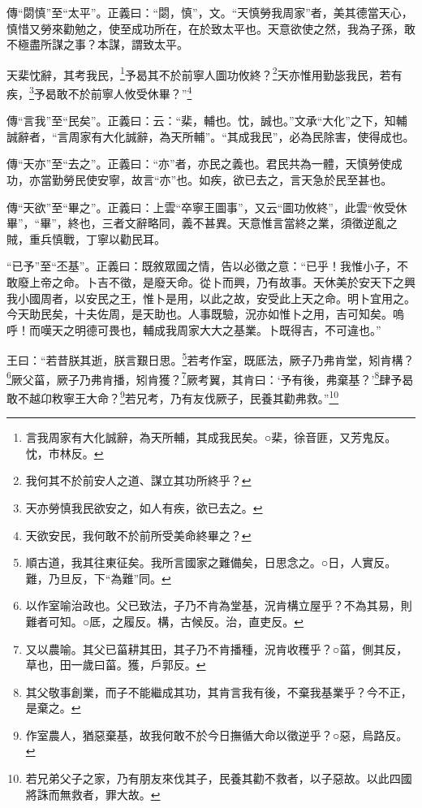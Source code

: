 {\noindent\zhuan{}\fzbyks 傳“閟慎”至“太平”。正義曰：“閟，慎”，文。“天慎勞我周家”者，美其德當天心，慎惜又勞來勸勉之，使至成功所在，在於致太平也。天意欲使之然，我為子孫，敢不極盡所謀之事？本謀，謂致太平。 \par}

天棐忱辭，其考我民，\footnote{言我周家有大化誠辭，為天所輔，其成我民矣。○棐，徐音匪，又芳鬼反。忱，市林反。}予曷其不於前寧人圖功攸終？\footnote{我何其不於前安人之道、謀立其功所終乎？}天亦惟用勤毖我民，若有疾，\footnote{天亦勞慎我民欲安之，如人有疾，欲已去之。}予曷敢不於前寧人攸受休畢？”\footnote{天欲安民，我何敢不於前所受美命終畢之？}

{\noindent\zhuan{}\fzbyks 傳“言我”至“民矣”。正義曰：云：“棐，輔也。忱，誠也。”文承“大化”之下，知輔誠辭者，“言周家有大化誠辭，為天所輔”。“其成我民”，必為民除害，使得成也。 \par}

{\noindent\zhuan{}\fzbyks 傳“天亦”至“去之”。正義曰：“亦”者，亦民之義也。君民共為一體，天慎勞使成功，亦當勤勞民使安寧，故言“亦”也。如疾，欲已去之，言天急於民至甚也。 \par}

{\noindent\zhuan{}\fzbyks 傳“天欲”至“畢之”。正義曰：上雲“卒寧王圖事”，又云“圖功攸終”，此雲“攸受休畢”，“畢”，終也，三者文辭略同，義不甚異。天意惟言當終之業，須徵逆亂之賊，重兵慎戰，丁寧以勸民耳。 \par}

{\noindent\shu{}\fzkt “已予”至“丕基”。正義曰：既敘眾國之情，告以必徵之意：“已乎！我惟小子，不敢廢上帝之命。卜吉不徵，是廢天命。從卜而興，乃有故事。天休美於安天下之興我小國周者，以安民之王，惟卜是用，以此之故，安受此上天之命。明卜宜用之。今天助民矣，十夫佐周，是天助也。人事既驗，況亦如惟卜之用，吉可知矣。嗚呼！而嘆天之明德可畏也，輔成我周家大大之基業。卜既得吉，不可違也。” \par}

王曰：“若昔朕其逝，朕言艱日思。\footnote{順古道，我其往東征矣。我所言國家之難備矣，日思念之。○日，人實反。難，乃旦反，下“為難”同。}若考作室，既厎法，厥子乃弗肯堂，矧肯構？\footnote{以作室喻治政也。父已致法，子乃不肯為堂基，況肯構立屋乎？不為其易，則難者可知。○厎，之履反。構，古候反。治，直吏反。}厥父菑，厥子乃弗肯播，矧肯獲？\footnote{又以農喻。其父已菑耕其田，其子乃不肯播種，況肯收穫乎？○菑，側其反，草也，田一歲曰菑。獲，戶郭反。}厥考翼，其肯曰：‘予有後，弗棄基？’\footnote{其父敬事創業，而子不能繼成其功，其肯言我有後，不棄我基業乎？今不正，是棄之。}肆予曷敢不越卬敉寧王大命？\footnote{作室農人，猶惡棄基，故我何敢不於今日撫循大命以徵逆乎？○惡，烏路反。}若兄考，乃有友伐厥子，民養其勸弗救。”\footnote{若兄弟父子之家，乃有朋友來伐其子，民養其勸不救者，以子惡故。以此四國將誅而無救者，罪大故。}


